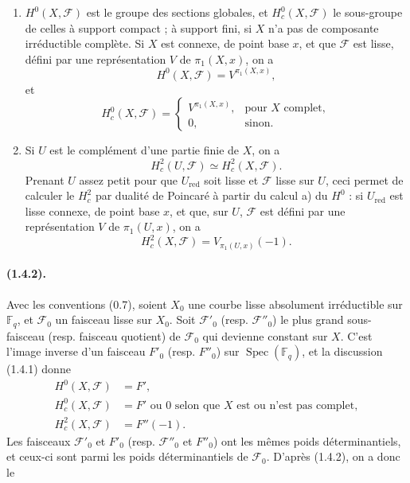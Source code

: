\documentclass[11pt]{article}
\theoremstyle{remark}
\newcommand{\Fq}{\mathbb{F}_q}
\newcommand{\Spec}{\operatorname{Spec}}
\begin{document}
\begin{enumerate}[label=\alph*)]
\item $H^0(X,\mathcal F)$ est le groupe des sections globales, et $H^0_c(X,\mathcal F)$ le sous-groupe de celles à support compact ; à support fini, si $X$ n'a pas de composante irréductible complète. Si $X$ est connexe, de point base $x$, et que $\mathcal F$ est lisse, défini par une représentation $V$ de $\pi_1(X,x)$, on a
\begin{equation}\tag{1.4.1.1}
H^0(X,\mathcal F)=V^{\pi_1(X,x)},
\end{equation}
et
\begin{equation}\tag{1.4.1.2}
H^0_c(X,\mathcal F)=
\begin{cases}
V^{\pi_1(X,x)},&\text{pour }X\text{ complet},\\
0,&\text{sinon}.
\end{cases}
\end{equation}

\item Si $U$ est le complément d'une partie finie de $X$, on a
\[
H^2_c(U,\mathcal F)\simeq H^2_c(X,\mathcal F).
\]
Prenant $U$ assez petit pour que $U_{\mathrm{red}}$ soit lisse et $\mathcal F$ lisse sur $U$, ceci permet de calculer le $H^2_c$ par dualité de Poincaré à partir du calcul a) du $H^0$ : si $U_{\mathrm{red}}$ est lisse connexe, de point base $x$, et que, sur $U$, $\mathcal F$ est défini par une représentation $V$ de $\pi_1(U,x)$, on a
\begin{equation}\tag{1.4.1.3}
H^2_c(X,\mathcal F)=V_{\pi_1(U,x)}(-1).
\end{equation}
\end{enumerate}

\paragraph{(1.4.2).} Avec les conventions (0.7), soient $X_0$ une courbe lisse absolument irréductible sur $\Fq$, et $\mathcal F_0$ un faisceau lisse sur $X_0$. Soit $\mathcal F'_0$ (resp. $\mathcal F''_0$) le plus grand sous-faisceau (resp. faisceau quotient) de $\mathcal F_0$ qui devienne constant sur $X$. C'est l'image inverse d'un faisceau $F'_0$ (resp. $F''_0$) sur $\Spec(\Fq)$, et la discussion (1.4.1) donne
\begin{align}
H^0(X,\mathcal F)&=F',\tag{1.4.2.1}\\
H^0_c(X,\mathcal F)&=F'\text{ ou }0\text{ selon que }X\text{ est ou n'est pas complet},\tag{1.4.2.2}\\
H^2_c(X,\mathcal F)&=F''(-1).\tag{1.4.2.3}
\end{align}
Les faisceaux $\mathcal F'_0$ et $F'_0$ (resp. $\mathcal F''_0$ et $F''_0$) ont les mêmes poids déterminantiels, et ceux-ci sont parmi les poids déterminantiels de $\mathcal F_0$. D'après (1.4.2), on a donc le
\end{document}

